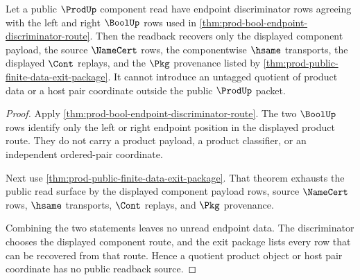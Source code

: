 \begin{theorem}
\label{thm:prod-bool-endpoint-readback-exhaustion}
Let a public $\ProdUp$ component read have endpoint discriminator rows agreeing
with the left and right $\BoolUp$ rows used in
\autoref{thm:prod-bool-endpoint-discriminator-route}. Then the readback recovers
only the displayed component payload, the source $\NameCert$ rows, the
componentwise $\hsame$ transports, the displayed $\Cont$ replays, and the
$\Pkg$ provenance listed by
\autoref{thm:prod-public-finite-data-exit-package}. It cannot introduce an
untagged quotient of product data or a host pair coordinate outside the public
$\ProdUp$ packet.
\end{theorem}
\begin{proof}
Apply \autoref{thm:prod-bool-endpoint-discriminator-route}. The two $\BoolUp$
rows identify only the left or right endpoint position in the displayed product
route. They do not carry a product payload, a product classifier, or an
independent ordered-pair coordinate.

Next use \autoref{thm:prod-public-finite-data-exit-package}. That theorem
exhausts the public read surface by the displayed component payload rows, source
$\NameCert$ rows, $\hsame$ transports, $\Cont$ replays, and $\Pkg$ provenance.

Combining the two statements leaves no unread endpoint data. The discriminator
chooses the displayed component route, and the exit package lists every row that
can be recovered from that route. Hence a quotient product object or host pair
coordinate has no public readback source.
\end{proof}
